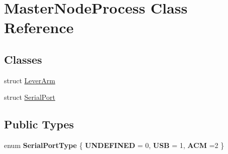 \hypertarget{classMasterNodeProcess}{}\section{Master\+Node\+Process Class Reference}
\label{classMasterNodeProcess}
\subsection*{Classes}
\begin{DoxyCompactItemize}
\item 
struct \hyperlink{structMasterNodeProcess_1_1LeverArm}{Lever\+Arm}
\item 
struct \hyperlink{structMasterNodeProcess_1_1SerialPort}{Serial\+Port}
\end{DoxyCompactItemize}
\subsection*{Public Types}
\begin{DoxyCompactItemize}
\item 
\mbox{\label{classMasterNodeProcess_acb6159000690011a53be2d57dda1975e}} 
enum {\bfseries Serial\+Port\+Type} \{ {\bfseries U\+N\+D\+E\+F\+I\+N\+ED} = 0, 
{\bfseries U\+SB} = 1, 
{\bfseries A\+CM} =2
 \}
\end{DoxyCompactItemize}
